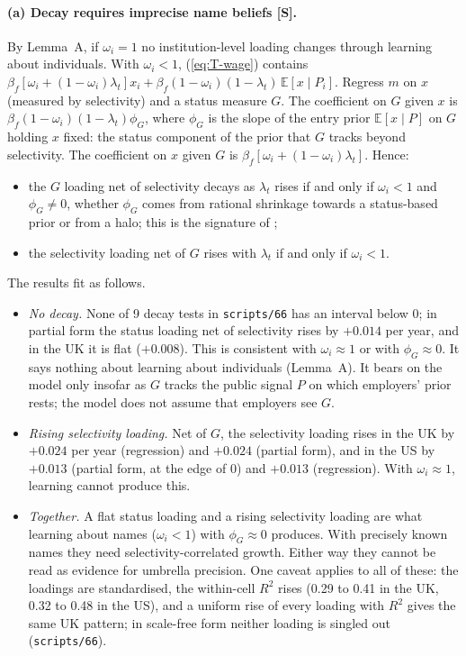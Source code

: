 \paragraph{(a) Decay requires imprecise name beliefs [S].} By Lemma~A, if $\omega_i=1$ no institution-level
loading changes through learning about individuals. With $\omega_i<1$, (\ref{eq:T-wage}) contains
$\beta_f[\omega_i+(1-\omega_i)\lambda_t]x_i+\beta_f(1-\omega_i)(1-\lambda_t)\,\mathbb E[x\mid P_i]$. Regress $m$ on
$x$ (measured by selectivity) and a status measure $G$. The coefficient on $G$ given $x$ is
$\beta_f(1-\omega_i)(1-\lambda_t)\phi_G$, where $\phi_G$ is the slope of the entry prior $\mathbb E[x\mid P]$ on $G$
holding $x$ fixed: the status component of the prior that $G$ tracks beyond selectivity. The coefficient on $x$
given $G$ is $\beta_f[\omega_i+(1-\omega_i)\lambda_t]$. Hence:
\begin{itemize}
\item the $G$ loading net of selectivity decays as $\lambda_t$ rises if and only if $\omega_i<1$ and $\phi_G\neq0$,
whether $\phi_G$ comes from rational shrinkage towards a status-based prior or from a halo; this is the signature
of \citet{altonji2001employer};
\item the selectivity loading net of $G$ rises with $\lambda_t$ if and only if $\omega_i<1$.
\end{itemize}
The results fit as follows.
\begin{itemize}
\item \emph{No decay.} None of 9 decay tests in \texttt{scripts/66} has an interval below 0; in partial form the
status loading net of selectivity rises by $+0.014$  per year, and in the UK it is flat
($+0.008$). This is consistent with $\omega_i\approx1$ or with $\phi_G\approx0$. It says nothing about learning
about individuals (Lemma~A). It bears on the model only insofar as $G$ tracks the public signal $P$ on which
employers' prior rests; the model does not assume that employers see $G$.
\item \emph{Rising selectivity loading.} Net of $G$, the selectivity loading rises in the UK by $+0.024$
 per year (regression) and $+0.024$  (partial form), and in the US by $+0.013$
 (partial form, at the edge of 0) and $+0.013$  (regression). With
$\omega_i\approx1$, learning cannot produce this.
\item \emph{Together.} A flat status loading and a rising selectivity loading are what learning about names
($\omega_i<1$) with $\phi_G\approx0$ produces. With precisely known names they need selectivity-correlated growth.
Either way they cannot be read as evidence for umbrella precision. One caveat applies to all of these: the loadings are standardised, the
within-cell $R^2$ rises (0.29 to 0.41 in the UK, 0.32 to 0.48 in the US), and a uniform rise of every loading with
$R^2$ gives the same UK pattern; in scale-free form neither loading is singled out (\texttt{scripts/66}).
\end{itemize}

